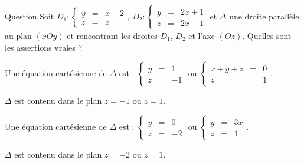 \begin{multi}[multiple,feedback=
{\(\Delta\) est parallèle au plan \((xOy)\) et rencontre l'axe  \((Oz)\), une représentation cartésienne de \(\Delta\) est donc  de la forme : 
\( \left\{\begin{array}{ccl}ax+by&=&0\\z&=&c, \quad a,b,c \in \Rr \end{array}\right.\). 
On peut supposer que \(b\) est non nul, sinon, \(\Delta\) ne rencontre pas \(D_1\) ou \(D_2\). Par conséquent, une représentation cartésienne de \(\Delta\) est donc  de la forme : 
\( \left\{\begin{array}{ccl}ax+y&=&0\\z&=&b, \quad a,b \in \Rr \end{array}\right.\).
On calcule \(a\) et \(b\) pour que \(\Delta\) rencontre \(D_1\) et \(D_2\).
}]{Question}
Soit  \(D_1 : \left\{\begin{array}{ccl}y&=&x+2\\z&=&x \end{array}\right.\),   
\(D_2 : \left\{\begin{array}{ccl}y&=&2x+1\\z&=&2x-1 \end{array}\right.\) et \(\Delta\) une droite parallèle au plan \((xOy)\) et rencontrant les droites \(D_1\), \(D_2\) et l'axe \((Oz)\). 
Quelles sont les assertions vraies ?

    \item Une équation cartésienne de \(\Delta\) est :
\( \left\{\begin{array}{ccl}y&=&1\\z&=&-1 \end{array}\right.\) ou
\( \left\{\begin{array}{ccl}x+y+z&=&0\\z&=&1 \end{array}\right.\).
    \item \(\Delta\) est contenu dans le plan \(z=-1\) ou \(z=1\).
    \item* Une équation cartésienne de \(\Delta\) est :
\( \left\{\begin{array}{ccl}y&=&0\\z&=&-2 \end{array}\right.\) ou
\( \left\{\begin{array}{ccl}y&=&3x\\z&=&1 \end{array}\right.\).
    \item* \(\Delta\) est contenu dans le plan \(z=-2\) ou \(z=1\).
\end{multi}


